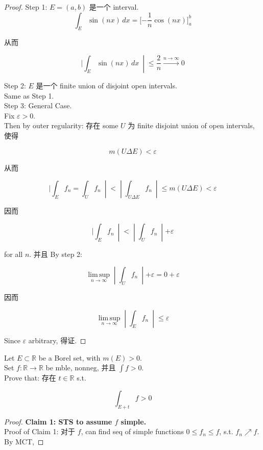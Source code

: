 \begin{proof}

Step 1: \(E = (a,b)\) 是一个 interval.\\

\[\int_{E}\sin(nx)\, dx = \lbrack - \frac{1}{n}\cos(nx)\rbrack_{a}^{b}\]

从而

\[\left. |\int_{E}\sin(nx)\, dx\  \middle| \leq \frac{2}{n}\overset{n\rightarrow\infty}{\rightarrow}0 \right.\]

Step 2: \(E\) 是一个 finite union of disjoint open intervals.\\
Same as Step 1.\\
Step 3: General Case.\\
Fix \(\varepsilon > 0\).\\
Then by outer regularity: 存在 some \(U\) 为 finite disjoint union of open intervals, 使得

\[m(U\Delta E) < \varepsilon\]

从而

\[\left. |\int_{E}f_{n} = \int_{U}f_{n}\  \middle| < \middle| \int_{U\Delta E}f_{n}\  \middle| \leq m(U\Delta E) < \varepsilon \right.\]

因而

\[\left. |\int_{E}f_{n}\  \middle| < \middle| \int_{U}f_{n}\  \middle| + \varepsilon \right.\]

for all \(n\). 并且 By step 2:

\[\left. \operatorname{lim\, sup}\limits_{n\rightarrow\infty} \middle| \int_{U}f_{n}\  \middle| + \varepsilon = 0 + \varepsilon \right.\]

因而

\[\left. \operatorname{lim\, sup}\limits_{n\rightarrow\infty} \middle| \int_{E}f_{n}\  \middle| \leq \varepsilon \right.\]

Since \(\varepsilon\) arbitrary, 得证.

\end{proof}

\begin{example}

Let \(E \subset \mathbb{R}\) be a Borel set, with \(m(E) > 0\).\\
Set \(f:\mathbb{R}\rightarrow\mathbb{R}\) be mble, nonneg, 并且 \(\int f > 0\).\\
Prove that: 存在 \(t \in \mathbb{R}\) s.t.

\[\int_{E + t}f > 0\]

\end{example}

\begin{proof}

\textbf{Claim 1: STS to assume \(f\) simple.}\\
Proof of Claim 1: 对于 \(f\), can find seq of simple functions \(0 \leq f_{n} \leq f\), s.t. \(f_{n}\operatorname{\nearrow }f\).\\
By MCT,

\end{proof}
